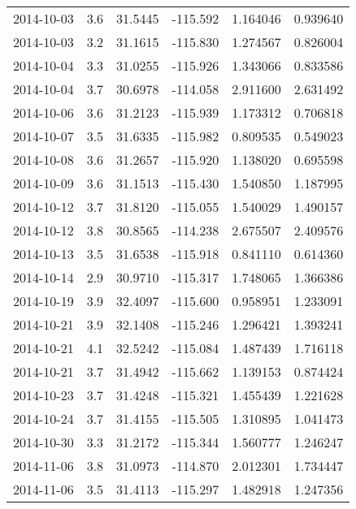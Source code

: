 \begin{tabular}{lrrrrr}
2014-10-03 &       3.6 &  31.5445 &  -115.592 &         1.164046 &         0.939640 \\
2014-10-03 &       3.2 &  31.1615 &  -115.830 &         1.274567 &         0.826004 \\
2014-10-04 &       3.3 &  31.0255 &  -115.926 &         1.343066 &         0.833586 \\
2014-10-04 &       3.7 &  30.6978 &  -114.058 &         2.911600 &         2.631492 \\
2014-10-06 &       3.6 &  31.2123 &  -115.939 &         1.173312 &         0.706818 \\
2014-10-07 &       3.5 &  31.6335 &  -115.982 &         0.809535 &         0.549023 \\
2014-10-08 &       3.6 &  31.2657 &  -115.920 &         1.138020 &         0.695598 \\
2014-10-09 &       3.6 &  31.1513 &  -115.430 &         1.540850 &         1.187995 \\
2014-10-12 &       3.7 &  31.8120 &  -115.055 &         1.540029 &         1.490157 \\
2014-10-12 &       3.8 &  30.8565 &  -114.238 &         2.675507 &         2.409576 \\
2014-10-13 &       3.5 &  31.6538 &  -115.918 &         0.841110 &         0.614360 \\
2014-10-14 &       2.9 &  30.9710 &  -115.317 &         1.748065 &         1.366386 \\
2014-10-19 &       3.9 &  32.4097 &  -115.600 &         0.958951 &         1.233091 \\
2014-10-21 &       3.9 &  32.1408 &  -115.246 &         1.296421 &         1.393241 \\
2014-10-21 &       4.1 &  32.5242 &  -115.084 &         1.487439 &         1.716118 \\
2014-10-21 &       3.7 &  31.4942 &  -115.662 &         1.139153 &         0.874424 \\
2014-10-23 &       3.7 &  31.4248 &  -115.321 &         1.455439 &         1.221628 \\
2014-10-24 &       3.7 &  31.4155 &  -115.505 &         1.310895 &         1.041473 \\
2014-10-30 &       3.3 &  31.2172 &  -115.344 &         1.560777 &         1.246247 \\
2014-11-06 &       3.8 &  31.0973 &  -114.870 &         2.012301 &         1.734447 \\
2014-11-06 &       3.5 &  31.4113 &  -115.297 &         1.482918 &         1.247356 \\

\end{tabular}
